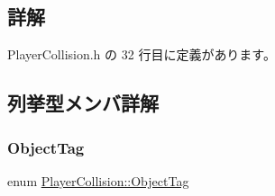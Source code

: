 \subsection{詳解}


 Player\+Collision.\+h の 32 行目に定義があります。



\subsection{列挙型メンバ詳解}
\mbox{\label{class_player_collision_a628e8898ff4fc1f85eb4ba44eb0a6907}} 
\subsubsection{\texorpdfstring{Object\+Tag}{ObjectTag}}
{\footnotesize\ttfamily enum \mbox{\hyperlink{class_player_collision_a628e8898ff4fc1f85eb4ba44eb0a6907}{Player\+Collision\+::\+Object\+Tag}}}

